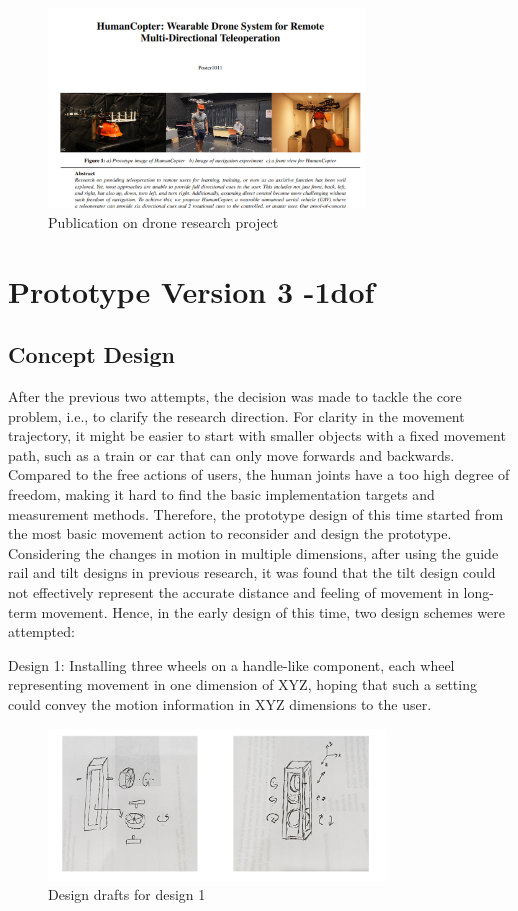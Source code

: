 \begin{figure}[h]
\centering
\includegraphics[width=0.75\textwidth]{A_thesis/figures/026.png}
\caption{Publication on drone research project}
\end{figure}


\section{Prototype Version 3 -1dof}
\subsection{Concept Design}
After the previous two attempts, the decision was made to tackle the core problem, i.e., to clarify the research direction. For clarity in the movement trajectory, it might be easier to start with smaller objects with a fixed movement path, such as a train or car that can only move forwards and backwards. Compared to the free actions of users, the human joints have a too high degree of freedom, making it hard to find the basic implementation targets and measurement methods. Therefore, the prototype design of this time started from the most basic movement action to reconsider and design the prototype.
Considering the changes in motion in multiple dimensions, after using the guide rail and tilt designs in previous research, it was found that the tilt design could not effectively represent the accurate distance and feeling of movement in long-term movement. Hence, in the early design of this time, two design schemes were attempted:

Design 1:
Installing three wheels on a handle-like component, each wheel representing movement in one dimension of XYZ, hoping that such a setting could convey the motion information in XYZ dimensions to the user.
\begin{figure}[h]
\centering
\includegraphics[width=0.8\textwidth]{A_thesis/figures/027.png}
\caption{Design drafts for design 1}
\end{figure}

